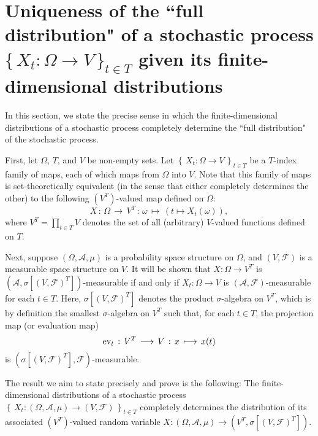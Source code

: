 

\section{Uniqueness of the ``full distribution" of a stochastic process
$\{\,X_{t} : \Omega \longrightarrow V\,\}_{t\in T}$ given
its finite-dimensional distributions}
\setcounter{theorem}{0}
\setcounter{equation}{0}

In this section, we state the precise sense in which the finite-dimensional distributions
of a stochastic process completely determine the ``full distribution" of the stochastic process.

First, let $\Omega$, $T$, and $V$ be non-empty sets.
Let $\left\{\,X_{t} : \Omega \longrightarrow V \,\right\}_{t \in T}$
be a $T$-index family of maps, each of which maps from $\Omega$ into $V$.
Note that this family of maps is set-theoretically equivalent
(in the sense that either completely determines the other)
to the following $(V^{T})$-valued map defined on $\Omega$:
\begin{equation*}
X \,:\, \Omega \,\longrightarrow\, V^{T} \,:\, \omega \,\longmapsto\, \left(t \longmapsto X_{t}(\omega)\right),
\end{equation*}
where $V^{T} = \prod_{t\in T}V$ denotes the set of all (arbitrary) $V$-valued functions defined on $T$.

Next, suppose $\left(\Omega,\mathcal{A},\mu\right)$ is a probability space structure on $\Omega$,
and $\left(V,\mathcal{F}\right)$ is a measurable space structure on $V$.
It will be shown that $X : \Omega \longrightarrow V^{T}$ is
$\left(\mathcal{A},\sigma[(V,\mathcal{F})^{T}]\right)$-measurable if and only if
$X_{t} : \Omega \longrightarrow V$ is $(\mathcal{A},\mathcal{F})$-measurable for each $t \in T$.
Here, $\sigma[(V,\mathcal{F})^{T}]$ denotes the product $\sigma$-algebra on $V^{T}$,
which is by definition the smallest $\sigma$-algebra on $V^{T}$ such that,
for each $t \in T$, the projection map (or evaluation map)
\begin{equation*}
\textnormal{ev}_{t} \,:\, V^{T} \, \longrightarrow\, V
\,:\, x \,\longmapsto\, x(t)
\end{equation*}
is $\left(\sigma[(V,\mathcal{F})^{T}],\mathcal{F}\right)$-measurable.

The result we aim to state precisely and prove is the following:
The finite-dimensional distributions of a stochastic process
$\left\{\,X_{t}: (\Omega,\mathcal{A},\mu) \longrightarrow (V,\mathcal{F})\,\right\}_{t \in T}$
completely determines the distribution of its associated $(V^{T})$-valued random variable
$X : (\Omega,\mathcal{A},\mu) \longrightarrow (V^{T},\sigma[(V,\mathcal{F})^{T}])$.

